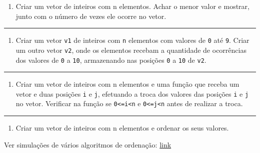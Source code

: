 \documentclass[12pt,a4paper]{article}
\providecommand{\tightlist}{%
      \setlength{\itemsep}{0pt}\setlength{\parskip}{0pt}}
\begin{document}
\begin{enumerate}
\def\labelenumi{\arabic{enumi}.}
\setcounter{enumi}{1}
\tightlist
\item
  Criar um vetor de inteiros com n elementos. Achar o menor valor e
  mostrar, junto com o número de vezes ele ocorre no vetor.
\end{enumerate}

    \begin{center}\rule{0.5\linewidth}{0.5pt}\end{center}

\begin{enumerate}
\def\labelenumi{\arabic{enumi}.}
\setcounter{enumi}{2}
\tightlist
\item
  Criar um vetor \texttt{v1} de inteiros com \texttt{n} elementos com
  valores de \texttt{0} até \texttt{9}. Criar um outro vetor
  \texttt{v2}, onde os elementos recebam a quantidade de ocorrências dos
  valores de \texttt{0} a \texttt{10}, armazenando nas posições
  \texttt{0} a \texttt{10} de \texttt{v2}.
\end{enumerate}

    \begin{center}\rule{0.5\linewidth}{0.5pt}\end{center}

\begin{enumerate}
\def\labelenumi{\arabic{enumi}.}
\setcounter{enumi}{3}
\tightlist
\item
  Criar um vetor de inteiros com n elementos e uma função que receba um
  vetor e duas posições \texttt{i} e \texttt{j}, efetuando a troca dos
  valores das posições \texttt{i} e \texttt{j} no vetor. Verificar na
  função se \texttt{0\textless{}=i\textless{}n} e
  \texttt{0\textless{}=j\textless{}n} antes de realizar a troca.
\end{enumerate}

    \begin{center}\rule{0.5\linewidth}{0.5pt}\end{center}

\begin{enumerate}
\def\labelenumi{\arabic{enumi}.}
\setcounter{enumi}{4}
\tightlist
\item
  Criar um vetor de inteiros com n elementos e ordenar os seus valores.
\end{enumerate}

Ver simulações de vários algoritmos de ordenação:
\href{https://www.toptal.com/developers/sorting-algorithms}{link}
\end{document}

